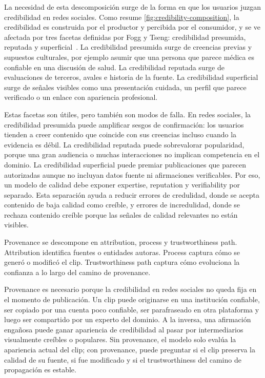 \documentclass[sigconf, nonacm]{acmart}
\begin{document}
La necesidad de esta descomposici\'on surge de la forma en que los usuarios juzgan
credibilidad en redes sociales. Como resume \autoref{fig:credibility-composition},
la credibilidad es construida por el productor y percibida por el consumidor, y se
ve afectada por tres facetas definidas por Fogg y Tseng: credibilidad presumida,
reputada y superficial~\cite{FoggTseng1999}. La credibilidad presumida surge de creencias previas y supuestos
culturales, por ejemplo asumir que una persona que parece m\'edica es confiable en
una discusi\'on de salud. La credibilidad reputada surge de evaluaciones de terceros,
avales e historia de la fuente. La credibilidad superficial surge de se\~nales
visibles como una presentaci\'on cuidada, un perfil que parece verificado o un enlace
con apariencia profesional.

Estas facetas son \'utiles, pero tambi\'en son modos de falla. En redes sociales, la
credibilidad presumida puede amplificar sesgos de confirmaci\'on: los usuarios
tienden a creer contenido que coincide con sus creencias incluso cuando la evidencia
es d\'ebil. La credibilidad reputada puede sobrevalorar popularidad, porque una gran
audiencia o muchas interacciones no implican competencia en el dominio. La
credibilidad superficial puede premiar publicaciones que parecen autorizadas aunque
no incluyan datos fuente ni afirmaciones verificables. Por eso, un modelo de calidad
debe exponer expertise, reputation y verifiability por separado. Esta separaci\'on
ayuda a reducir errores de credulidad, donde se acepta contenido de baja calidad
como cre\'ible, y errores de incredulidad, donde se rechaza contenido cre\'ible porque
las se\~nales de calidad relevantes no est\'an visibles.

Provenance se descompone en attribution, process y trustworthiness path.
Attribution identifica fuentes o entidades autoras. Process captura c\'omo se gener\'o
o modific\'o el clip. Trustworthiness path captura c\'omo evoluciona la confianza a lo
largo del camino de provenance.

Provenance es necesario porque la credibilidad en redes sociales no queda fija en el
momento de publicaci\'on. Un clip puede originarse en una instituci\'on confiable,
ser copiado por una cuenta poco confiable, ser parafraseado en otra plataforma y
luego ser compartido por un experto del dominio. A la inversa, una afirmaci\'on
enga\~nosa puede ganar apariencia de credibilidad al pasar por intermediarios
visualmente cre\'ibles o populares. Sin provenance, el modelo solo eval\'ua la
apariencia actual del clip; con provenance, puede preguntar si el clip preserva la
calidad de su fuente, si fue modificado y si el trustworthiness del camino de
propagaci\'on es estable.
\end{document}
